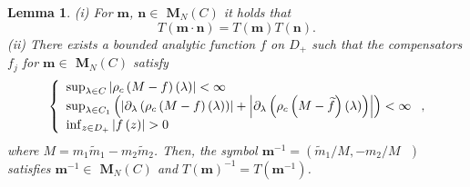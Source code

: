 \documentclass[a4paper]{article}%
\newtheorem{lemma}{Lemma}
\begin{document}
\begin{lemma}
\label{l2-2}(i) For $\boldsymbol{m}$, $\boldsymbol{n}\in$ $\boldsymbol{M}%
_{N}\left(  C\right)  $ it holds that%
\[
T\left(  \boldsymbol{m}\cdot\boldsymbol{n}\right)  =T\left(  \boldsymbol{m}%
\right)  T\left(  \boldsymbol{n}\right)  \text{.}%
\]
(ii) There exists a bounded analytic function $f$ on $D_{+}$ such that the
compensators $f_{j}$ for $\boldsymbol{m}\in$ $\boldsymbol{M}_{N}\left(
C\right)  $ satisfy%
\begin{equation}
\left\{
\begin{array}
[c]{l}%
\sup_{\lambda\in C}\left\vert \rho_{c}\left(  M-f\right)  \left(
\lambda\right)  \right\vert <\infty\\
\sup_{\lambda\in C_{1}}\left(  \left\vert \partial_{\lambda}\left(  \rho
_{c}\left(  M-f\right)  \left(  \lambda\right)  \right)  \right\vert
+\left\vert \partial_{\lambda}\left(  \rho_{c}\left(  M-\widetilde{f}\right)
\left(  \lambda\right)  \right)  \right\vert \right)  <\infty\\
\inf_{z\in D_{+}}\left\vert f\left(  z\right)  \right\vert >0
\end{array}
\right.  \text{,} \label{2-5}%
\end{equation}
where $M=m_{1}\widetilde{m}_{1}-m_{2}\widetilde{m}_{2}$. Then, the symbol
$\boldsymbol{m}^{-1}=\left(  \widetilde{m}_{1}/M,-m_{2}/M\text{ }\right)  $
satisfies $\boldsymbol{m}^{-1}\in$ $\boldsymbol{M}_{N}\left(  C\right)  $ and
$T\left(  \boldsymbol{m}\right)  ^{-1}=T\left(  \boldsymbol{m}^{-1}\right)  $.
\end{lemma}
\end{document}
